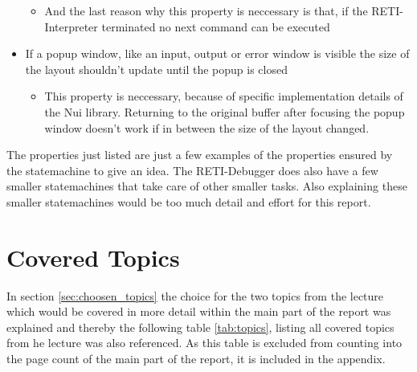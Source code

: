 \documentclass{report}
\begin{document}
\begin{itemize}
\begin{itemize}
		\item And the last reason why this property is neccessary is that, if the RETI-Interpreter terminated no next command can be executed
	\end{itemize}
	\item If a \alert{popup} window, like an input, output or error window is \alert{visible} the size of the layout shouldn't update until the popup is closed
	\begin{itemize}
		\item This property is neccessary, because of specific implementation details of the Nui library. Returning to the original buffer after focusing the popup window doesn't work if in between the size of the layout changed.
	\end{itemize}
\end{itemize}

The properties just listed are just a few examples of the properties ensured by the statemachine to give an idea. The RETI-Debugger does also have a few smaller statemachines that take care of other smaller tasks. Also explaining these smaller statemachines would be too much detail and effort for this report.

\section{Covered Topics}

In section \ref{sec:choosen_topics} the choice for the two topics from the lecture which would be covered in more detail within the main part of the report was explained and thereby the following table \ref{tab:topics}, listing all covered topics from he lecture was also referenced. As this table is excluded from counting into the page count of the main part of the report, it is included in the appendix.
\end{document}
